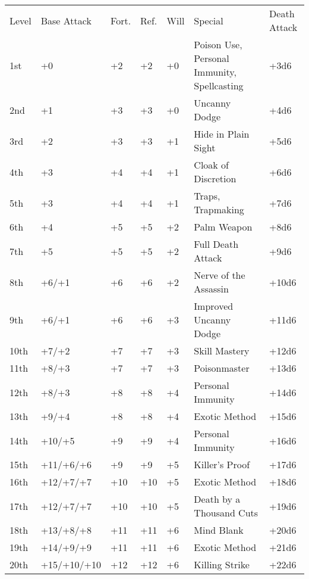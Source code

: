 \begin{table}[htb]
\fontsize{10pt}{12pt}\selectfont
\centering
{}
\begin{tabular}{p{.275in}p{.75in}p{0.275in}p{0.275in}p{0.275in}L{3.075in}C{0.575in}}
 Level &Base Attack &Fort. &Ref. &Will &Special& Death Attack\\
1st &+0 &+2 &+2 &+0 &Poison Use, Personal Immunity, Spellcasting&+3d6\\
2nd &+1 &+3 &+3 &+0 &Uncanny Dodge& +4d6\\
3rd &+2 &+3 &+3 &+1 &Hide in Plain Sight& +5d6\\
4th &+3 &+4 &+4 &+1 &Cloak of Discretion& +6d6\\
5th &+3 &+4 &+4 &+1 &Traps, Trapmaking& +7d6\\
6th &+4 &+5 &+5 &+2 &Palm Weapon& +8d6\\
7th &+5 &+5 &+5 &+2 &Full Death Attack& +9d6\\
8th &+6/+1 &+6 &+6 &+2 &Nerve of the Assassin& +10d6\\
9th &+6/+1 &+6 &+6 &+3 &Improved Uncanny Dodge& +11d6\\
10th &+7/+2 &+7 &+7 &+3 &Skill Mastery& +12d6\\
11th &+8/+3 &+7 &+7 &+3 &Poisonmaster& +13d6\\
12th &+8/+3 &+8 &+8 &+4 &Personal Immunity& +14d6\\
13th &+9/+4 &+8 &+8 &+4 &Exotic Method& +15d6\\
14th &+10/+5 &+9 &+9 &+4 &Personal Immunity& +16d6\\
15th &+11/+6/+6 &+9 &+9 &+5 &Killer's Proof& +17d6\\
16th &+12/+7/+7 &+10 &+10 &+5 &Exotic Method& +18d6\\
17th &+12/+7/+7 &+10 &+10 &+5 &Death by a Thousand Cuts& +19d6\\
18th &+13/+8/+8 &+11 &+11 &+6 &Mind Blank& +20d6\\
19th &+14/+9/+9 &+11 &+11 &+6 &Exotic Method& +21d6\\
20th &+15/+10/+10 &+12 &+12 &+6 &Killing Strike& +22d6\\
\end{tabular}
\end{table}

